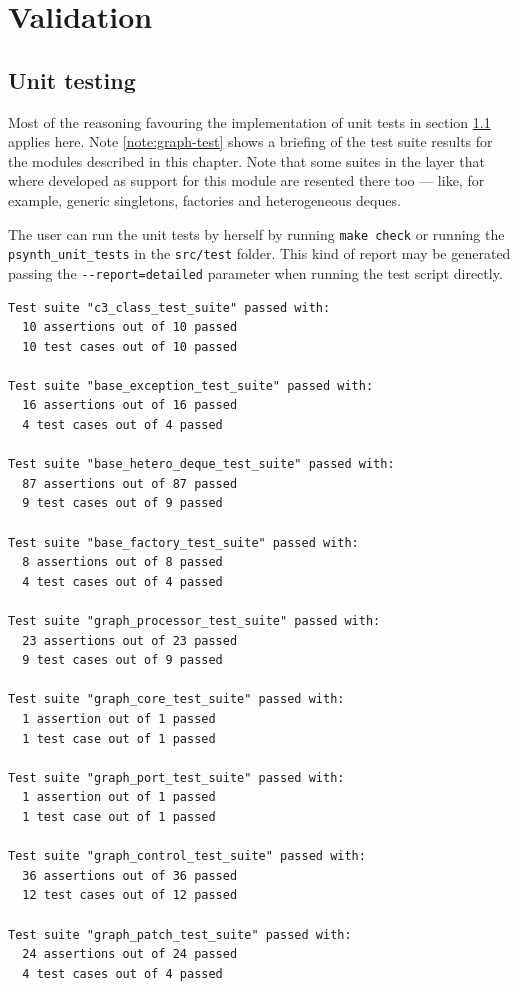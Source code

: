 \section{Validation}

\subsection{Unit testing}
\label{sec:sound-unittest}

Most of the reasoning favouring the implementation of unit tests in
section \ref{sec:sound-unittest} applies here. Note
\ref{note:graph-test} shows a briefing of the test suite results for
the modules described in this chapter. Note that some suites in the
 layer that where developed as support for this module are
resented there too --- like, for example, generic singletons,
factories and heterogeneous deques.

\begin{mynote}
\label{note:graph-test}
The user can run the unit tests by herself by running \texttt{make
  check} or running the \texttt{psynth\_unit\_tests} in the
\texttt{src/test} folder. This kind of report may be generated passing
the \verb|--report=detailed| parameter when running the test script
directly.  {\small
\begin{verbatim}
Test suite "c3_class_test_suite" passed with:
  10 assertions out of 10 passed
  10 test cases out of 10 passed

Test suite "base_exception_test_suite" passed with:
  16 assertions out of 16 passed
  4 test cases out of 4 passed

Test suite "base_hetero_deque_test_suite" passed with:
  87 assertions out of 87 passed
  9 test cases out of 9 passed

Test suite "base_factory_test_suite" passed with:
  8 assertions out of 8 passed
  4 test cases out of 4 passed

Test suite "graph_processor_test_suite" passed with:
  23 assertions out of 23 passed
  9 test cases out of 9 passed

Test suite "graph_core_test_suite" passed with:
  1 assertion out of 1 passed
  1 test case out of 1 passed

Test suite "graph_port_test_suite" passed with:
  1 assertion out of 1 passed
  1 test case out of 1 passed

Test suite "graph_control_test_suite" passed with:
  36 assertions out of 36 passed
  12 test cases out of 12 passed

Test suite "graph_patch_test_suite" passed with:
  24 assertions out of 24 passed
  4 test cases out of 4 passed
\end{verbatim}
}
\end{mynote}


